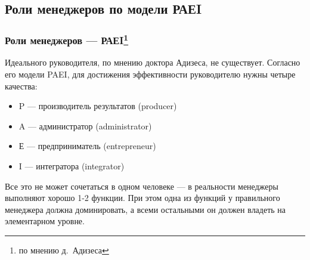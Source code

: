 \documentclass{../industrial-development}
\begin{document}
\subsection{Роли менеджеров по модели РАЕI}

\begin{frame} \frametitle{Роли менеджеров — РАЕI\footnote[2]{по мнению д.~Адизеса}}
	Идеального руководителя, по мнению доктора Адизеса, не существует. Согласно его модели PAEI, для достижения эффективности руководителю нужны четыре качества: 
 \begin{itemize}
	 \item \alert{P} — производитель результатов (producer) 
	 \item \alert{A} — администратор (administrator) 
	 \item \alert{Е} — предприниматель (entrepreneur) 
	 \item \alert{I} — интегратора (integrator)
 \end{itemize}
Все это не может сочетаться в одном человеке — в реальности менеджеры выполняют хорошо 1-2 функции. При этом одна из функций у правильного менеджера должна доминировать, а всеми остальными он должен владеть на элементарном уровне.  \\

\end{frame}
\lecturenotes
\end{document}
